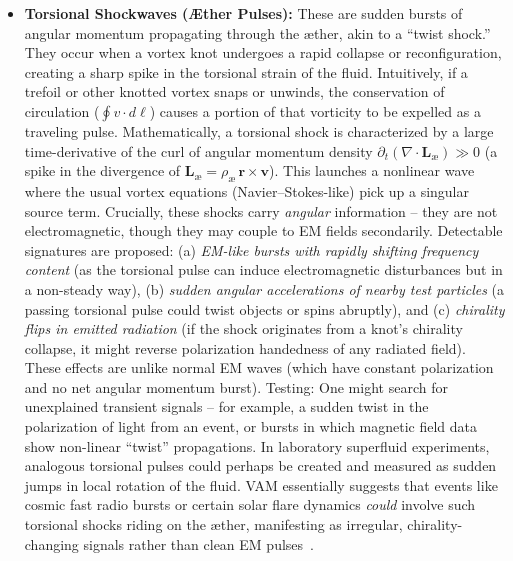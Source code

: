 \documentclass[a4paper,12pt]{article}
\begin{document}
\begin{itemize}

\item 
\textbf{Torsional Shockwaves (Æther Pulses):} These are sudden bursts of angular momentum propagating through the æther, akin to a “twist shock.” They occur when a vortex knot undergoes a rapid collapse or reconfiguration, creating a sharp spike in the torsional strain of the fluid. Intuitively, if a trefoil or other knotted vortex snaps or unwinds, the conservation of circulation ($\oint v\cdot d\ell$) causes a portion of that vorticity to be expelled as a traveling pulse. Mathematically, a torsional shock is characterized by a large time-derivative of the curl of angular momentum density $\partial_t(\nabla\cdot \mathbf{L}_{\text{\ae}}) \gg 0$ (a spike in the divergence of $\mathbf{L}_{\text{\ae}} = \rho_{\text{\ae}}\, \mathbf{r}\times\mathbf{v}$). This launches a nonlinear wave where the usual vortex equations (Navier–Stokes-like) pick up a singular source term. Crucially, these shocks carry \textit{angular} information – they are not electromagnetic, though they may couple to EM fields secondarily. Detectable signatures are proposed: (a) \textit{EM-like bursts with rapidly shifting frequency content} (as the torsional pulse can induce electromagnetic disturbances but in a non-steady way), (b) \textit{sudden angular accelerations of nearby test particles} (a passing torsional pulse could twist objects or spins abruptly), and (c) \textit{chirality flips in emitted radiation} (if the shock originates from a knot’s chirality collapse, it might reverse polarization handedness of any radiated field). These effects are unlike normal EM waves (which have constant polarization and no net angular momentum burst). Testing: One might search for unexplained transient signals – for example, a sudden twist in the polarization of light from an event, or bursts in which magnetic field data show non-linear “twist” propagations. In laboratory superfluid experiments, analogous torsional pulses could perhaps be created and measured as sudden jumps in local rotation of the fluid. VAM essentially suggests that events like cosmic fast radio bursts or certain solar flare dynamics \textit{could} involve such torsional shocks riding on the æther, manifesting as irregular, chirality-changing signals rather than clean EM pulses~\cite{vamcore}.


\end{itemize}
\end{document}

